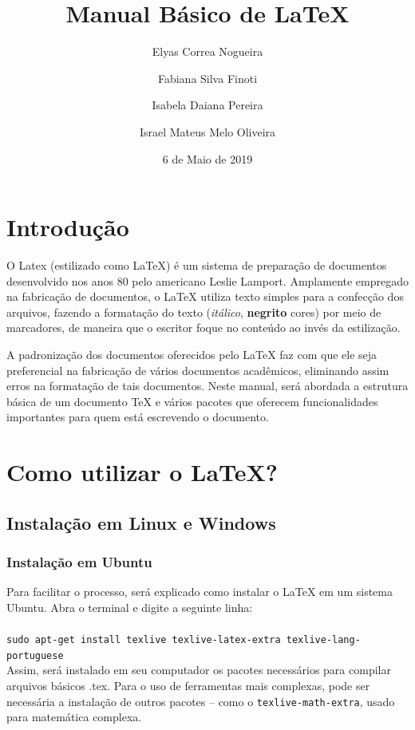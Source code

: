 \documentclass[12pt]{article}
\title{Manual Básico de LaTeX}
\author{
	Elyas Correa Nogueira\\
	\and
	Fabiana Silva Finoti\\
	\and
	Isabela Daiana Pereira\\
	\and
	Israel Mateus Melo Oliveira\\	
}
\date{6 de Maio de 2019}
\begin{document}
	
	\maketitle
	
	\newpage
	
	\section{Introdução}
	O Latex (estilizado como \LaTeX) é um sistema de preparação de documentos desenvolvido nos anos 80 pelo americano Leslie Lamport. Amplamente empregado na fabricação de documentos, o LaTeX utiliza texto simples para a confecção dos arquivos, fazendo a formatação do texto (\textit{itálico}, \textbf{negrito} {\color{red} cores}) por meio de marcadores, de maneira que o escritor foque no conteúdo ao invés da estilização.
	
	A padronização dos documentos oferecidos pelo LaTeX faz com que ele seja preferencial na fabricação de vários documentos acadêmicos, eliminando assim erros na formatação de tais documentos. Neste manual, será abordada a estrutura básica de um documento TeX e vários pacotes que oferecem funcionalidades importantes para quem está escrevendo o documento.
	
	\section{Como utilizar o LaTeX?}
	
		\subsection{Instalação em Linux e Windows}
		
			\subsubsection{Instalação em Ubuntu}
			Para facilitar o processo, será explicado como instalar o LaTeX em um sistema Ubuntu. Abra o terminal e digite a seguinte linha:\\\\
			\texttt{sudo apt-get install texlive texlive-latex-extra texlive-lang-portuguese}\\
			
			Assim, será instalado em seu computador os pacotes necessários para compilar arquivos básicos .tex. Para o uso de ferramentas mais complexas, pode ser necessária a instalação de outros pacotes -- como o \texttt{texlive-math-extra}, usado para matemática complexa. 
			
\end{document}
